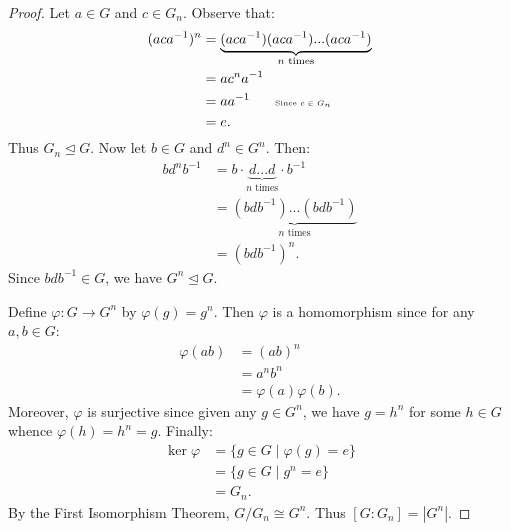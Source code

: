 \documentclass[10pt,twoside,openany]{memoir}
\begin{document}
    \begin{proof}
        Let $a \in G$ and $c \in G_n$. Observe that:
            \begin{equation*}
            \begin{split}
                (aca^{-1})^n
                & = \underbrace{(aca^{-1})(aca^{-1})...(aca^{-1})}_{n\text{ times}} \\
                & = ac^n a^{-1} \\
                & = aa^{-1} \h9\h9\text{\tiny Since $c \in G_n$}\\
                & = e.
            \end{split}
            \end{equation*}
        Thus $G_n \trianglelefteq G$. Now let $b \in G$ and $d^n \in G^n$. Then:
            \begin{equation*}
            \begin{split}
                bd^nb^{-1}
                & = b\cdot \underbrace{d...d}_{n \text{ times}}\cdot b^{-1} \\
                & = \underbrace{(bdb^{-1})...(bdb^{-1})}_{n \text{ times}} \\
                & = (bdb^{-1})^n.
            \end{split}
            \end{equation*}
        Since $bdb^{-1} \in G$, we have $G^n \trianglelefteq G$.

        Define $\varphi:G \rightarrow G^n$ by $\varphi(g) = g^n$. Then $\varphi$ is a homomorphism since for any $a,b \in G$:
            \begin{equation*}
            \begin{split}
                \varphi(ab)
                & = (ab)^n \\
                & = a^n b^n \\
                & = \varphi(a)\varphi(b).
            \end{split}
            \end{equation*}
        Moreover, $\varphi$ is surjective since given any $g \in G^n$, we have $g = h^n$ for some $h \in G$ \textemdash whence $\varphi(h) = h^n = g$. Finally:
            \begin{equation*}
            \begin{split}
                \ker \varphi 
                & = \{g \in G \mid \varphi(g) = e\} \\
                & = \{g \in G \mid g^n = e \} \\
                & = G_n.
            \end{split}
            \end{equation*}
        By the First Isomorphism Theorem, $G/G_n \cong G^n$. Thus $[G:G_n] = |G^n|$.
    \end{proof}
\end{document}
